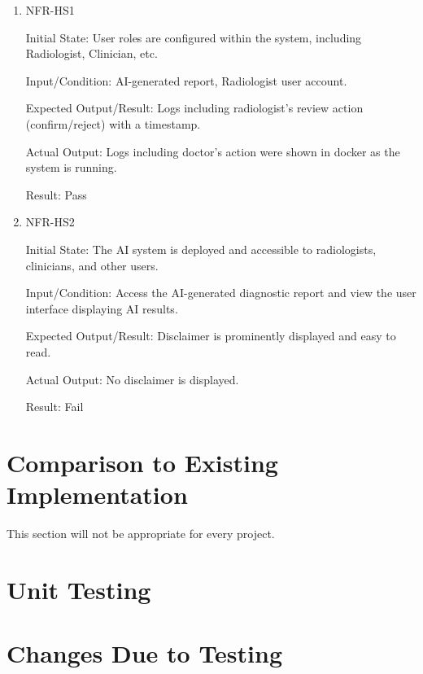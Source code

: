 \documentclass[12pt, titlepage]{article}
\begin{document}
\begin{enumerate}

  \item{NFR-HS1\\}\label{NFR-HS1}

  Initial State: User roles are configured within the system, including Radiologist, Clinician, etc.

  Input/Condition: AI-generated report, Radiologist user account.
  
  Expected Output/Result: Logs including radiologist’s review action (confirm/reject) with a timestamp.

  Actual Output: Logs including doctor's action were shown in docker as the system is running.

  Result: Pass

  \item{NFR-HS2\\}\label{NFR-HS2}

  Initial State: The AI system is deployed and accessible to radiologists, clinicians, and other users.

  Input/Condition: Access the AI-generated diagnostic report and view the user interface displaying AI results.

  Expected Output/Result: Disclaimer is prominently displayed and easy to read.

  Actual Output: No disclaimer is displayed.

  Result: Fail
  \end{enumerate}

\section{Comparison to Existing Implementation}	

This section will not be appropriate for every project.

\section{Unit Testing}

\section{Changes Due to Testing}

\end{document}
